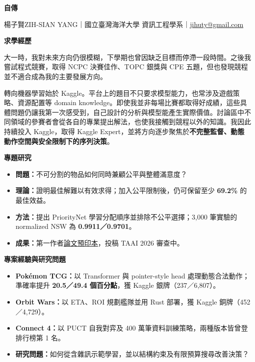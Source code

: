 \documentclass[11pt,a4paper]{article}
\newcommand{\autosection}[1]{%
  \vspace{11pt}%
  {\color{navy}\fontsize{13}{16.5}\selectfont\bfseries #1}\par
  \vspace{3.5pt}{\color{rulecolor}\hrule height 0.7pt}\vspace{8pt}}
\newcommand{\tldrbox}[1]{%
  \vspace{1pt}%
  \begingroup
  \setlength{\fboxsep}{8pt}%
  \setlength{\fboxrule}{0.8pt}%
  \noindent\fcolorbox{teal!38}{teal!5}{%
    \begin{minipage}{\dimexpr\linewidth-2\fboxsep-2\fboxrule\relax}
      {\color{teal}\fontsize{9.2}{11}\selectfont\bfseries TL;DR}\par
      \vspace{3pt}%
      {\color{ink}\fontsize{10.5}{14.5}\selectfont #1}\par
    \end{minipage}}%
  \endgroup
  \vspace{7pt}%
}
\begin{document}
\color{ink}
\fontsize{11}{15.9}\selectfont

\begin{center}
  {\color{navy}\fontsize{23}{28}\selectfont\bfseries 自\hspace{0.35em}傳}\par
  \vspace{6pt}
  {\color{muted}\fontsize{9.4}{12}\selectfont
  楊子賢\;ZIH-SIAN YANG｜國立臺灣海洋大學 資訊工程學系｜\href{mailto:jihuty@gmail.com}{jihuty@gmail.com}}
\end{center}
\vspace{2pt}

\autosection{求學經歷}


大一時，我對未來方向仍很模糊，下學期也曾因缺乏目標而停滯一段時間。之後我嘗試程式競賽，取得 NCPC 決賽佳作、TOPC 銀獎與 CPE 五題，但也發現競程並不適合成為我的主要發展方向。

轉向機器學習始於 Kaggle。平台上的題目不只要求模型能力，也常涉及遊戲策略、資源配置等 domain knowledge。即使我並非每場比賽都取得好成績，這些具體問題仍讓我第一次感受到，自己設計的分析與模型能產生實際價值。討論區中不同領域的參賽者會從各自的專業提出解法，也使我接觸到競程以外的知識。我因此持續投入 Kaggle，取得 Kaggle Expert，並將方向逐步聚焦於\textbf{不完整監督、動態動作空間與安全限制下的序列決策}。


\autosection{專題研究}

\begin{itemize}[leftmargin=1.35em,itemsep=3pt,topsep=1pt]
  \item \textbf{問題：}不可分割的物品如何同時兼顧公平與整體滿意度？
  \item \textbf{理論：}證明最佳解難以有效求得；加入公平限制後，仍可保留至少 \textbf{69.2\%} 的最佳效益。
  \item \textbf{方法：}提出 PriorityNet 學習分配順序並排除不公平選擇；3,000 筆實驗的 normalized NSW 為 \textbf{0.9911／0.9701}。
  \item \textbf{成果：}第一作者\href{https://arxiv.org/abs/2609.03846}{論文預印本}，投稿 TAAI 2026 審查中。
\end{itemize}

\autosection{專案經驗與研究問題}

\begin{itemize}[leftmargin=1.35em,itemsep=3pt,topsep=1pt]
  \item \textbf{Pokémon TCG：}以 Transformer 與 pointer-style head 處理動態合法動作；準確率提升 \textbf{20.5／49.4 個百分點}，獲 Kaggle 銀牌（237／6,807）。
  \item \textbf{Orbit Wars：}以 ETA、ROI 規劃艦隊並用 Rust 部署，獲 Kaggle 銅牌（452／4,729）。
  \item \textbf{Connect 4：}以 PUCT 自我對弈及 400 萬筆資料訓練策略，兩種版本皆曾登排行榜第 1 名。
  \item \textbf{研究問題：}如何從含雜訊示範學習，並以結構約束及有限預算搜尋改善決策？
\end{itemize}
\end{document}
